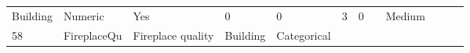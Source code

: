 \documentclass[11pt]{article}
\begin{document}
\begin{longtable}[]{@{}llllllllllll@{}}
\begin{minipage}[t]{0.04\columnwidth}
Building\strut
\end{minipage} & \begin{minipage}[t]{0.04\columnwidth}\raggedright\strut
Numeric\strut
\end{minipage} & \begin{minipage}[t]{0.04\columnwidth}\raggedright\strut
Yes\strut
\end{minipage} & \begin{minipage}[t]{0.04\columnwidth}\raggedright\strut
0\strut
\end{minipage} & \begin{minipage}[t]{0.04\columnwidth}\raggedright\strut
0\strut
\end{minipage} & \begin{minipage}[t]{0.04\columnwidth}\raggedright\strut
3\strut
\end{minipage} & \begin{minipage}[t]{0.04\columnwidth}\raggedright\strut
0\strut
\end{minipage} & \begin{minipage}[t]{0.04\columnwidth}\raggedright\strut
\strut
\end{minipage} & \begin{minipage}[t]{0.04\columnwidth}\raggedright\strut
Medium\strut
\end{minipage}\tabularnewline
\begin{minipage}[t]{0.04\columnwidth}\raggedright\strut
58\strut
\end{minipage} & \begin{minipage}[t]{0.04\columnwidth}\raggedright\strut
FireplaceQu\strut
\end{minipage} & \begin{minipage}[t]{0.04\columnwidth}\raggedright\strut
Fireplace quality\strut
\end{minipage} & \begin{minipage}[t]{0.04\columnwidth}\raggedright\strut
Building\strut
\end{minipage} & \begin{minipage}[t]{0.04\columnwidth}\raggedright\strut
Categorical\strut
\end{minipage} & \begin{minipage}[t]{0.04\columnwidth}\raggedright\strut
\strut
\end{minipage} & \begin{minipage}[t]{0.04\columnwidth}\raggedright\strut
\strut
\end{minipage} & \begin{minipage}[t]{0.04\columnwidth}\raggedright\strut

\end{minipage}
\end{longtable}
\end{document}
